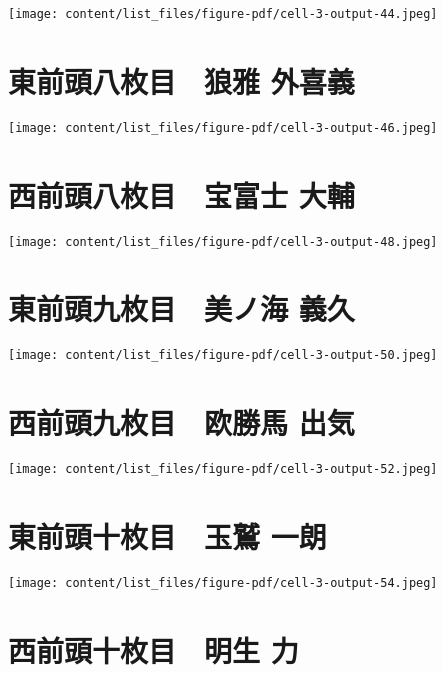 \documentclass[
  letterpaper,
]{bxjsbook}
\begin{document}
\texttt{[image: content/list\_files/figure-pdf/cell-3-output-44.jpeg]}

\section{東前頭八枚目　狼雅
外喜義}\label{ux6771ux524dux982dux516bux679aux76ee-ux72fcux96c5-ux5916ux559cux7fa9}

\texttt{[image: content/list\_files/figure-pdf/cell-3-output-46.jpeg]}

\section{西前頭八枚目　宝富士
大輔}\label{ux897fux524dux982dux516bux679aux76ee-ux5b9dux5bccux58eb-ux5927ux8f14}

\texttt{[image: content/list\_files/figure-pdf/cell-3-output-48.jpeg]}

\section{東前頭九枚目　美ノ海
義久}\label{ux6771ux524dux982dux4e5dux679aux76ee-ux7f8eux30ceux6d77-ux7fa9ux4e45}

\texttt{[image: content/list\_files/figure-pdf/cell-3-output-50.jpeg]}

\section{西前頭九枚目　欧勝馬
出気}\label{ux897fux524dux982dux4e5dux679aux76ee-ux6b27ux52ddux99ac-ux51faux6c17}

\texttt{[image: content/list\_files/figure-pdf/cell-3-output-52.jpeg]}

\section{東前頭十枚目　玉鷲
一朗}\label{ux6771ux524dux982dux5341ux679aux76ee-ux7389ux9df2-ux4e00ux6717}

\texttt{[image: content/list\_files/figure-pdf/cell-3-output-54.jpeg]}

\section{西前頭十枚目　明生
力}\label{ux897fux524dux982dux5341ux679aux76ee-ux660eux751f-ux529b}
\end{document}

